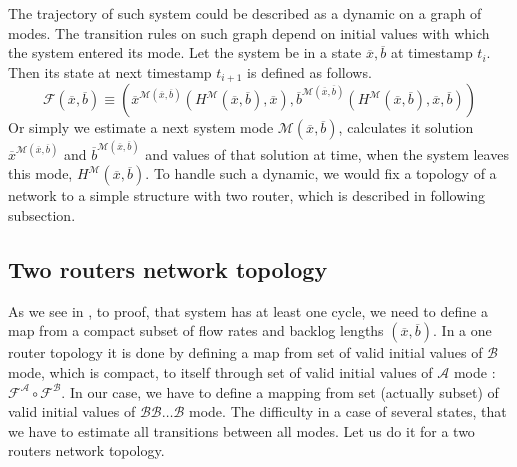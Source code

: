 The trajectory of such system could be described as a dynamic on a graph of modes. The transition rules on such graph depend on initial values with which the system entered its mode. Let the system be in a state $\overline{x}, \overline{b}$ at timestamp $t_i$. Then its state at next timestamp $t_{i+1}$ is defined as follows.
\begin{equation}
    \mathcal{F}(\overline{x}, \overline{b}) \equiv (\overline{x}^{\mathcal{M}(\overline{x}, \overline{b})}(H^\mathcal{M}(\overline{x}, \overline{b}), \overline{x}), \overline{b}^{\mathcal{M}(\overline{x}, \overline{b})}(H^\mathcal{M}(\overline{x}, \overline{b}), \overline{x}, \overline{b}))
\end{equation}
Or simply we estimate a next system mode $\mathcal{M}(\overline{x}, \overline{b})$, calculates it solution $\overline{x}^{\mathcal{M}(\overline{x}, \overline{b})}$ and $\overline{b}^{\mathcal{M}(\overline{x}, \overline{b})}$ and values of that solution at time, when the system leaves this mode, $H^\mathcal{M}(\overline{x}, \overline{b})$. To handle such a dynamic, we would fix a topology of a network to a simple structure with two router, which is described in following subsection.

\subsection{Two routers network topology}
\label{subsec:two_routers}
As we see in \cite[Proposition 7.1]{Lai:PLT}, to proof, that system has at least one cycle, we need to define a map from a compact subset of flow rates and backlog lengths $(\overline{x}, \overline{b})$. In a one router topology it is done by defining a map from set of valid initial values of $\mathcal{B}$ mode, which is compact, to itself through set of valid initial values of $\mathcal{A}$ mode : $\mathcal{F^A} \circ \mathcal{F^B}$. In our case, we have to define a mapping from set (actually subset) of valid initial values of $\mathcal{BB}\ldots\mathcal{B}$ mode. The difficulty in a case of several states, that we have to estimate all transitions between all modes. Let us do it for a two routers network topology.

